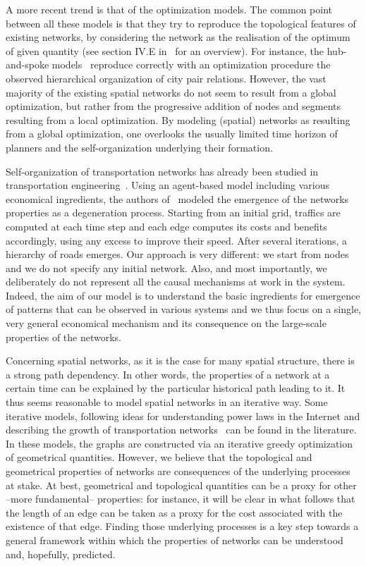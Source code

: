 A more recent trend is that of the optimization models. The common point between
all these models is that they try to reproduce the topological features of
existing networks, by considering the network as the realisation of the optimum
of given quantity (see section IV.E in~\cite{Barthelemy:2011} for an overview).
For instance, the hub-and-spoke models~\cite{OKelly:1998} reproduce correctly
with an optimization procedure the observed hierarchical organization of city
pair relations. However, the vast majority of the existing spatial networks do
not seem to result from a global optimization, but rather from the progressive
addition of nodes and segments resulting from a local optimization. By modeling
(spatial) networks as resulting from a global optimization, one overlooks the
usually limited time horizon of planners and the self-organization underlying
their formation.

Self-organization of transportation networks has already been studied in
transportation engineering~\cite{Levinson:2006, Xie:2009}. Using an agent-based
model including various economical ingredients, the authors
of~\cite{Levinson:2006} modeled the emergence of the networks properties as a
degeneration process. Starting from an initial grid, traffics are computed at
each time step and each edge computes its costs and benefits accordingly, using
any excess to improve their speed. After several iterations, a hierarchy of
roads emerges. Our approach is very different: we start from nodes and we do not
specify any initial network. Also, and most importantly, we deliberately do not
represent all the causal mechanisms at work in the system. Indeed, the aim of
our model is to understand the basic ingredients for emergence of patterns that
can be observed in various systems and we thus focus on a single, very general
economical mechanism and its consequence on the large-scale properties of the
networks.

Concerning spatial networks, as it is the case for many spatial structure, there
is a strong path dependency. In other words, the properties of a network at a
certain time can be explained by the particular historical path leading to it.
It thus seems reasonable to model spatial networks in an iterative way. Some
iterative models, following ideas for understanding power laws in the Internet
\cite{Fabrikant:2002} and describing the growth of transportation
networks~\cite{Gastner:2006} can be found in the literature. In these models,
the graphs are constructed via an iterative greedy optimization of geometrical
quantities. However, we believe that the topological and geometrical properties
of networks are consequences of the underlying processes at stake. At best,
geometrical and topological quantities can be a proxy for other --more
fundamental-- properties: for instance, it will be clear in what follows that
the length of an edge can be taken as a proxy for the cost associated with the
existence of that edge. Finding those underlying processes is a key step towards
a general framework within which the properties of networks can be understood
and, hopefully, predicted.\\

